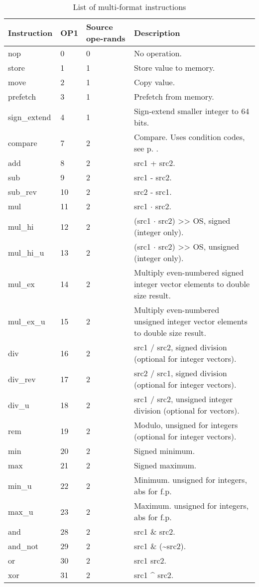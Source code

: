 \documentclass[forwardcom.tex]{subfiles}
\begin{document}
\begin{longtable} {|p{18mm}|p{9mm}|p{9mm}|p{76mm}|}
\caption{
List of multi-format instructions} 
\label{table:ListOfMultiFormatInstructions} \\
\endfirsthead
\endhead
\hline
\bfseries Instruction & \bfseries OP1 & \bfseries Source ope-rands & \bfseries Description \\
\hline
nop          &  0 & 0 & No operation. \\
store        &  1 & 1 & Store value to memory. \\
move         &  2 & 1 & Copy value. \\
prefetch     &  3 & 1 & Prefetch from memory. \\
sign\_extend &  4 & 1 & Sign-extend smaller integer to 64 bits. \\
compare      &  7 & 2 & Compare. Uses condition codes, see p. \pageref{table:conditionCodesForCompareInstruction}. \\
add          &  8 & 2 & src1 + src2. \\
sub          &  9 & 2 & src1 - src2. \\
sub\_rev     & 10 & 2 & src2 - src1. \\
mul          & 11 & 2 & src1 $\cdot$ src2. \\ 
mul\_hi      & 12 & 2 & (src1 $\cdot$ src2) \textgreater\textgreater{} OS, signed (integer only). \\
mul\_hi\_u   & 13 & 2 & (src1 $\cdot$ src2) \textgreater\textgreater{}  OS, unsigned (integer only). \\
mul\_ex      & 14 & 2 & Multiply even-numbered signed integer vector elements to double size result. \\
mul\_ex\_u   & 15 & 2 & Multiply even-numbered unsigned integer vector elements to double size result. \\
div          & 16 & 2 & src1 / src2, signed division (optional for integer vectors). \\
div\_rev     & 17 & 2 & src2 / src1, signed division (optional for integer vectors). \\
div\_u       & 18 & 2 & src1 / src2, unsigned integer division (optional for vectors). \\
rem          & 19 & 2 & Modulo, unsigned for integers (optional for integer vectors). \\
min          & 20 & 2 & Signed minimum. \\
max          & 21 & 2 & Signed maximum. \\
min\_u       & 22 & 2 & Minimum. unsigned for integers, abs for f.p. \\
max\_u       & 23 & 2 & Maximum. unsigned for integers, abs for f.p. \\
and          & 28 & 2 & src1 \& src2. \\
and\_not     & 29 & 2 & src1 \& (\~{}src2). \\
or           & 30 & 2 & src1 \textbar{} src2. \\
xor          & 31 & 2 & src1 \^{} src2. \\


\end{longtable}
\end{document}
